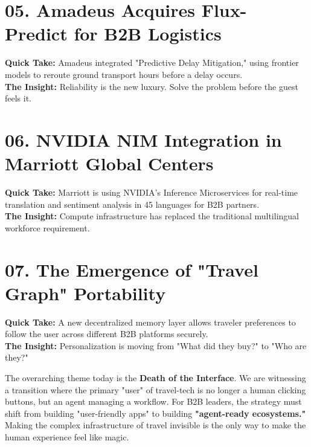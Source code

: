 \documentclass[11pt, a4paper]{article}
\begin{document}
\section{05. Amadeus Acquires Flux-Predict for B2B Logistics}
\textbf{Quick Take:} Amadeus integrated "Predictive Delay Mitigation," using frontier models to reroute ground transport hours before a delay occurs. \\
\textbf{\color{accentred}The Insight:} Reliability is the new luxury. Solve the problem before the guest feels it.

\section{06. NVIDIA NIM Integration in Marriott Global Centers}
\textbf{Quick Take:} Marriott is using NVIDIA’s Inference Microservices for real-time translation and sentiment analysis in 45 languages for B2B partners. \\
\textbf{\color{accentred}The Insight:} Compute infrastructure has replaced the traditional multilingual workforce requirement.

\section{07. The Emergence of "Travel Graph" Portability}
\textbf{Quick Take:} A new decentralized memory layer allows traveler preferences to follow the user across different B2B platforms securely. \\
\textbf{\color{accentred}The Insight:} Personalization is moving from "What did they buy?" to "Who are they?"

\vspace{30pt}

\begin{tcolorbox}[
    enhanced,
    colback=headerblack,
    colframe=headerblack,
    coltext=white,
    arc=4pt,
    outer arc=4pt,
    title=\textbf{\large EDITORIAL: MY TWO CENTS},
    fonttitle=\bfseries,
    attach title to upper,
    after title={\medskip\par}
]
The overarching theme today is the \textbf{Death of the Interface}. We are witnessing a transition where the primary "user" of travel-tech is no longer a human clicking buttons, but an agent managing a workflow. For B2B leaders, the strategy must shift from building "user-friendly apps" to building \textbf{"agent-ready ecosystems."} Making the complex infrastructure of travel invisible is the only way to make the human experience feel like magic.
\end{tcolorbox}
\end{document}
